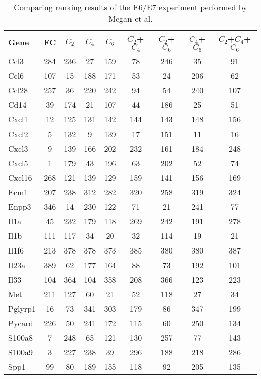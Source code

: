 \documentclass[oneside,phd]{snuthesis}
\begin{document}
\begin{table}[]
\begin{tabular}{l || c c c c c c c c} \hline
Gene    & FC  & $C_2$  & $C_4$  & $C_6$  & $C_2$+$C_4$ & $C_2$+$C_6$ & $C_4$+$C_6$ & $C_2$+$C_4$+$C_6$ \\\hline
Ccl3    & 284 & 236 & 27  & 159 & 78    & 246   & 35    & 91       \\
Ccl6    & 107 & 15  & 188 & 171 & 53    & 24    & 206   & 62       \\
Ccl28   & 257 & 36  & 220 & 242 & 94    & 54    & 240   & 107      \\
Cd14    & 39  & 174 & 21  & 107 & 44    & 186   & 25    & 51       \\
Cxcl1   & 12  & 125 & 131 & 142 & 144   & 143   & 148   & 156      \\
Cxcl2   & 5   & 132 & 9   & 139 & 17    & 151   & 11    & 16       \\
Cxcl3   & 9   & 139 & 166 & 202 & 232   & 161   & 184   & 248      \\
Cxcl5   & 1   & 179 & 43  & 196 & 63    & 202   & 52    & 74       \\
Cxcl16  & 268 & 121 & 139 & 129 & 159   & 141   & 156   & 169      \\
Ecm1    & 207 & 238 & 312 & 282 & 320   & 258   & 319   & 324      \\
Enpp3   & 346 & 14  & 230 & 122 & 71    & 21    & 241   & 77       \\
Il1a    & 45  & 232 & 179 & 118 & 269   & 242   & 191   & 278      \\
Il1b    & 111 & 117 & 34  & 20  & 32    & 114   & 19    & 21       \\
Il1f6   & 213 & 378 & 378 & 373 & 385   & 380   & 380   & 387      \\
Il23a   & 389 & 62  & 177 & 164 & 88    & 73    & 192   & 101      \\
Il33    & 104 & 364 & 104 & 358 & 208   & 366   & 123   & 223      \\
Met     & 211 & 127 & 60  & 21  & 52    & 118   & 27    & 34       \\
Pglyrp1 & 16  & 73  & 341 & 303 & 179   & 86    & 347   & 199      \\
Pycard  & 226 & 50  & 241 & 172 & 115   & 60    & 250   & 134      \\
S100a8  & 7   & 248 & 65  & 121 & 130   & 257   & 77    & 143      \\
S100a9  & 3   & 227 & 238 & 39  & 296   & 188   & 218   & 286      \\
Spp1    & 99  & 80  & 189 & 155 & 118   & 92    & 205   & 135     \\\hline
\end{tabular}
\caption{Comparing ranking results of the E6/E7 experiment performed by Megan et al.}
\label{venndianet_table2}
\end{table}
\end{document}
